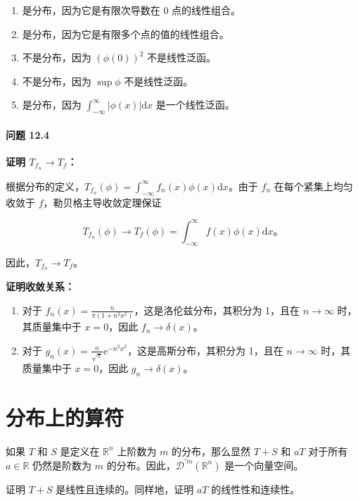 \begin{enumerate}
\def\labelenumi{(\alph{enumi})}
\item
  是分布，因为它是有限次导数在 0 点的线性组合。
\item
  是分布，因为它是有限多个点的值的线性组合。
\item
  不是分布，因为 $(\phi(0))^2$ 不是线性泛函。
\item
  不是分布，因为 $\sup \phi$ 不是线性泛函。
\item
  是分布，因为 $\int_{-\infty}^\infty |\phi(x)| \mathrm{d}x$
  是一个线性泛函。
\end{enumerate}

\paragraph{问题 12.4}\label{ux95eeux9898-12.4}

\textbf{证明 $T_{f_n} \to T_f$：}

根据分布的定义，$T_{f_n}(\phi) = \int_{-\infty}^\infty f_n(x) \phi(x) \mathrm{d}x$。由于
$f_n$ 在每个紧集上均匀收敛于 $f$，勒贝格主导收敛定理保证

$$
T_{f_n}(\phi) \to T_f(\phi) = \int_{-\infty}^\infty f(x) \phi(x) \mathrm{d}x。
$$

因此，$T_{f_n} \to T_f$。

\textbf{证明收敛关系：}

\begin{enumerate}
\def\labelenumi{\arabic{enumi}.}
\item
  对于 $f_n(x) = \frac{n}{\pi(1 + n^2 x^2)}$，这是洛伦兹分布，其积分为
  1，且在 $n \to \infty$ 时，其质量集中于 $x = 0$，因此
  $f_n \to \delta(x)$。
\item
  对于
  $g_n(x) = \frac{n}{\sqrt{\pi}} \mathrm{e}^{-n^2 x^2}$，这是高斯分布，其积分为
  1，且在 $n \to \infty$ 时，其质量集中于 $x = 0$，因此
  $g_n \to \delta(x)$。
\end{enumerate}

\section{分布上的算符}\label{sec:12.2}

如果 $T$ 和 $S$ 是定义在 $\mathbb{R}^n$ 上阶数为 $m$
的分布，那么显然 $T + S$ 和 $a T$ 对于所有 $a \in \mathbb{R}$
仍然是阶数为 $m$
的分布。因此，$\mathcal{D}^{\prime m}(\mathbb{R}^n)$ 是一个向量空间。
\begin{exercise}
  证明 $T + S$ 是线性且连续的。同样地，证明 $a T$
的线性性和连续性。
\end{exercise}

